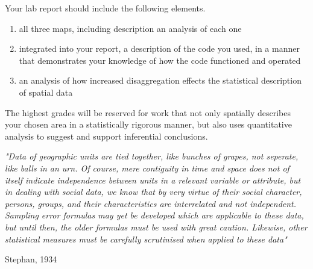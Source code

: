 \documentclass{article}
\begin{document}
Your lab report should include the following elements.

\begin{enumerate}[leftmargin=15mm]

\item all three maps, including description an analysis of each one

\item integrated into your report, a description of the code you used, in a manner that demonstrates your knowledge of how the code functioned and operated

\item an analysis of how increased disaggregation effects the statistical description of spatial data

\end{enumerate}

The highest grades will be reserved for work that not only spatially describes your chosen area in a statistically rigorous manner, but also uses quantitative analysis to suggest and support inferential conclusions. \\

\vspace{7mm}

\setlength{\leftskip}{0cm}

\large{\textit{"Data of geographic units are tied together, like bunches of grapes, not seperate, like balls in an urn.  Of course, mere contiguity in time and space does not of itself indicate independence between units in a relevant variable or attribute, but in dealing with social data, we know that by very virtue of their social character, persons, groups, and their characteristics are interrelated and not independent. Sampling error formulas may yet be developed which are applicable to these data, but until then, the older formulas must be used with great caution.  Likewise, other statistical measures must be carefully scrutinised when applied to these data"}
\begin{flushright}
Stephan, 1934
\end{flushright}
}

\end{document}
